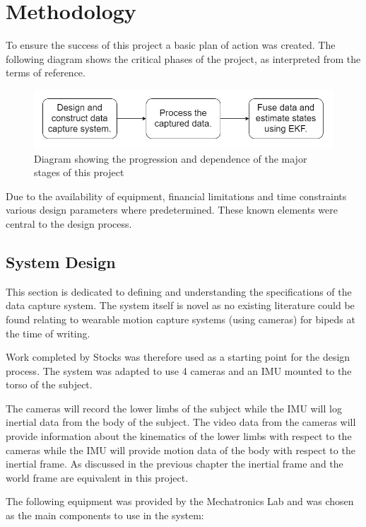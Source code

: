 \chapter{Methodology}
To ensure the success of this project a basic plan of action was created. The following diagram shows the critical phases of the project, as interpreted from the terms of reference.

\begin{figure}[!ht] 
\captionsetup{width=0.8\linewidth, font=small}  
\includegraphics[width=0.8\linewidth]{figures/planOfAction.png}
\caption{Diagram showing the progression and dependence of the major stages of this project}
\label{fig:planOfAction}
\end{figure}

Due to the availability of equipment, financial limitations and time constraints various design parameters where predetermined. These known elements were central to the design process.
  
\section{System Design}
This section is dedicated to defining and understanding the specifications of the data capture system. The system itself is novel as no existing literature could be found relating to wearable motion capture systems (using cameras) for bipeds at the time of writing.

Work completed by Stocks \cite{bradstocks} was therefore used as a starting point for the design process. The system was adapted to use 4 cameras and an IMU mounted to the torso of the subject. 

The cameras will record the lower limbs of the subject while the IMU will log inertial data from the body of the subject. The video data from the cameras will provide information about the kinematics of the lower limbs with respect to the cameras while the IMU will provide motion data of the body with respect to the inertial frame. As discussed in the previous chapter the inertial frame and the world frame are equivalent in this project. 

The following equipment was provided by the Mechatronics Lab and was chosen as the main components to use in the system:

